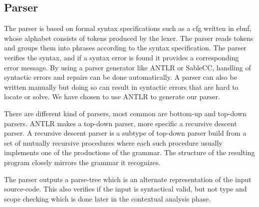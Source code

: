 \subsection*{Parser}\label{subsec:parser}
The parser is based on formal syntax specifications such as a \acrfull{cfg} written in \acrfull{ebnf}, whose alphabet consists of tokens produced by the lexer. 
The parser reads tokens and groups them into phrases according to the syntax specification.
The parser verifies the syntax, and if a syntax error is found it provides a corresponding error message. \citep{Crafting_book}
By using a parser generator like ANTLR or SableCC, handling of syntactic errors and repairs can be done automatically.
A parser can also be written manually but doing so can result in syntactic errors that are hard to locate or solve.
We have chosen to use ANTLR to generate our parser.

There are different kind of parsers, most common are bottom-up and top-down parsers.
ANTLR makes a top-down parser, more specific a recursive descent parser.
A recursive descent parser is a subtype of top-down parser build from a set of mutually recursive procedures where each such procedure usually implements one of the productions of the grammar.
The structure of the resulting program closely mirrors the grammar it recognizes. \citep{Recursive_programming}

The parser outputs a parse-tree which is an alternate representation of the input source-code. 
This also verifies if the input is syntactical valid, but not type and scope checking which is done later in the contextual analysis phase. 


